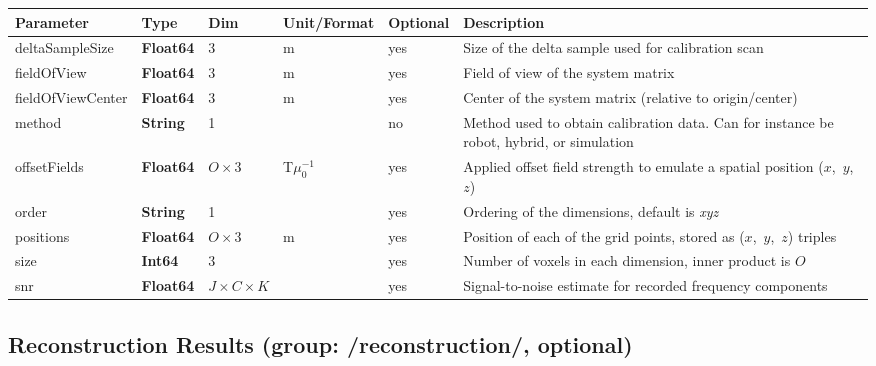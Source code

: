 \documentclass[landscape,a4paper]{article} %
\newcommand{\inltab}[1]{{\ttfamily\bfseries\color{blue}#1}}
\newcommand{\inlvar}[1]{{\ttfamily#1}}
\begin{document}
\setlength\extrarowheight{5pt}
\noindent \begin{tabularx}{\columnwidth}{llp{3cm}llX} 
\textbf{Parameter} & \textbf{Type} & \textbf{Dim} & \textbf{Unit/Format} & \textbf{Optional} & \textbf{Description} \\ \hline 
\inlvar{deltaSampleSize} & \inltab{Float64} & 3 & m & yes & Size of the delta sample used for calibration scan \\ \hline
\inlvar{fieldOfView} & \inltab{Float64} & $3$ & m & yes & Field of view of the system matrix \\ \hline
\inlvar{fieldOfViewCenter} & \inltab{Float64} & $3$ & m & yes & Center of the system matrix (relative to origin/center) \\ \hline
\inlvar{method} & \inltab{String} & 1 & & no & Method used to obtain calibration data. Can for instance be robot, hybrid, or simulation \\ \hline
\inlvar{offsetFields} & \inltab{Float64} & $O \times 3$ & T$\mu_0^{-1}$ & yes & Applied offset field strength to emulate a spatial position \mbox{($x$, $y$, $z$)}\\ \hline
\inlvar{order} & \inltab{String} & 1 & & yes & Ordering of the dimensions, default is \textit{xyz} \\ \hline
\inlvar{positions} & \inltab{Float64} & $O \times 3$ & m & yes & Position of each of the grid points, stored as \mbox{($x$, $y$, $z$)} triples \\ \hline
\inlvar{size} & \inltab{Int64} & $3$ &  & yes & Number of voxels in each dimension, inner product is $O$ \\ \hline
\inlvar{snr} & \inltab{Float64} & $J \times C \times K$ &  & yes & Signal-to-noise estimate for recorded frequency components \\ \hline
\end{tabularx}
\setlength\extrarowheight{0pt}

\newpage
\subsection{Reconstruction Results (group: \inlvar{/reconstruction/}, optional)}
\end{document}
